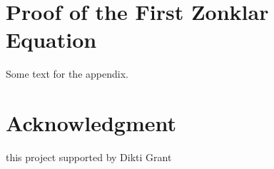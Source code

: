 \documentclass[journal]{IEEEtran}
\begin{document}





					      \appendices
					      \section{Proof of the First Zonklar Equation}
					      Some text for the appendix.

					      \section*{Acknowledgment}


					      this project supported by Dikti Grant
\end{document}
